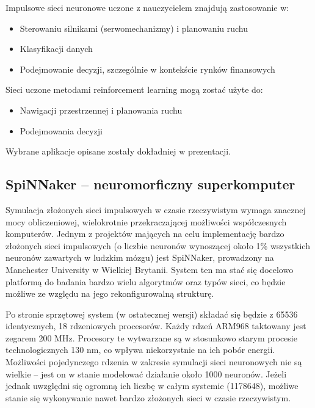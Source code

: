 \documentclass[11pt]{article}
\begin{document}
Impulsowe sieci neuronowe uczone z nauczycielem znajdują zastosowanie w:

\begin{itemize}

\item Sterowaniu silnikami (serwomechanizmy) i planowaniu ruchu
\item Klasyfikacji danych
\item Podejmowanie decyzji, szczególnie w kontekście rynków finansowych

\end{itemize}

Sieci uczone metodami reinforcement learning mogą zostać użyte do:

\begin{itemize}

\item Nawigacji przestrzennej i planowania ruchu
\item Podejmowania decyzji

\end{itemize}

Wybrane aplikacje opisane zostały dokładniej w prezentacji. 


\subsection{SpiNNaker -- neuromorficzny superkomputer}

Symulacja złożonych sieci impulsowych w czasie rzeczywistym wymaga znacznej mocy obliczeniowej, wielokrotnie przekraczającej możliwości współczesnych komputerów. Jednym z projektów mających na celu implementację bardzo złożonych sieci impulsowych (o liczbie neuronów wynoszącej około 1\% wszystkich neuronów zawartych w ludzkim mózgu) jest SpiNNaker, prowadzony na Manchester University w Wielkiej Brytanii. System ten ma stać się docelowo platformą do badania bardzo wielu algorytmów oraz typów sieci, co będzie możliwe ze względu na jego rekonfigurowalną strukturę.

Po stronie sprzętowej system (w ostatecznej wersji) składać się będzie z 65536 identycznych, 18 rdzeniowych procesorów. Każdy rdzeń ARM968 taktowany jest zegarem 200 MHz. Procesory te wytwarzane są w stosunkowo starym procesie technologicznych 130 nm, co wpływa niekorzystnie na ich pobór energii. Możliwości pojedynczego rdzenia w zakresie symulacji sieci neuronowych nie są wielkie -- jest on w stanie modelować działanie około 1000 neuronów. Jeżeli jednak uwzględni się ogromną ich liczbę w całym systemie (1178648), możliwe stanie się wykonywanie nawet bardzo złożonych sieci w czasie rzeczywistym. 
\end{document}
